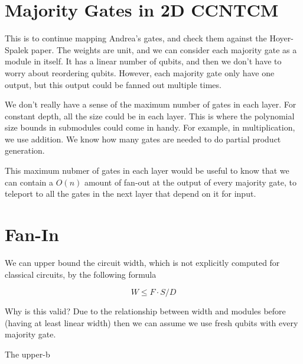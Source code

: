 \documentclass{article}
\begin{document}
\section{Majority Gates in \textsf{2D CCNTCM}}

This is to continue mapping Andrea's gates, and check them against
the Hoyer-Spalek paper. The weights are unit, and we can consider
each majority gate as a module in itself. It has a linear number
of qubits, and then we don't have to worry about reordering qubits.
However, each majority gate only have one output, but this output
could be fanned out multiple times.

We don't really have a sense of the maximum number of gates in each
layer. For constant depth, all the size could be in each layer.
This is where the polynomial size bounds in submodules could
come in handy. For example, in multiplication, we use addition.
We know how many gates are needed to do partial product generation.

This maximum nubmer of gates in each layer would be useful to know
that we can contain a $O(n)$ amount of fan-out at the output of
every majority gate, to teleport to all the gates in the next layer
that depend on it for input.

\section{Fan-In}

We can upper bound the circuit width, which is not explicitly computed
for classical circuits, by the following formula

\begin{equation}
W \le F \cdot S / D
\end{equation}

Why is this valid? Due to the relationship between width and modules before
(having at least linear width) then we can assume we use fresh qubits
with every majority gate.

The upper-b
\end{document}

